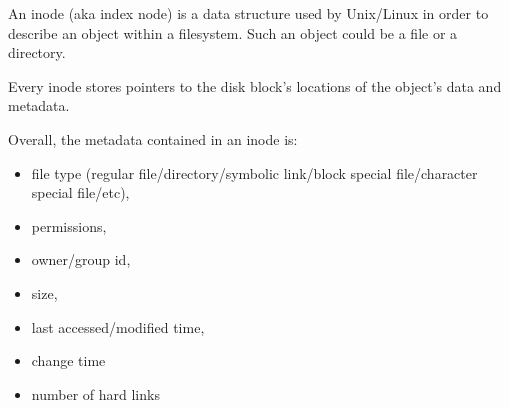 An inode (aka index node) is a data structure used by Unix/Linux in order to
describe an object within a filesystem. Such an object could be a file or a directory.

Every inode stores pointers to the disk block’s locations of the object’s data and
metadata.

Overall, the metadata contained in an inode is:

\begin{itemize}
    \item file type (regular file/directory/symbolic link/block special file/character special file/etc),
    \item permissions,
    \item owner/group id,
    \item size,
    \item last accessed/modified time,
    \item change time
    \item number of hard links
\end{itemize}


